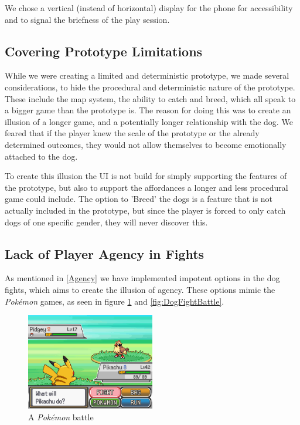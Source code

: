 
We chose a vertical (instead of horizontal) display for the phone for accessibility and to signal the briefness of the play session.

\subsection{Covering Prototype Limitations}
\label{limitations}
While we were creating a limited and deterministic prototype, we made several considerations, to hide the procedural and deterministic nature of the prototype. These include the map system, the ability to catch and breed, which all speak to a bigger game than the prototype is. The reason for doing this was to create an illusion of a longer game, and a potentially longer relationship with the dog. We feared that if the player knew the scale of the prototype or the already determined outcomes, they would not allow themselves to become emotionally attached to the dog. \

To create this illusion the UI is not build for simply supporting the features of the prototype, but also to support the affordances a longer and less procedural game could include. The option to 'Breed' the dogs is a feature that is not actually included in the prototype, but since the player is forced to only catch dogs of one specific gender, they will never discover this.\

\subsection{Lack of Player Agency in Fights}
As mentioned in \ref{Agency} we have implemented impotent options in the dog fights, which aims to create the illusion of agency. These options mimic the \textit{Pokémon} games, as seen in figure \ref{fig:PokeBattle} and \ref{fig:DogFightBattle}. \

\begin{figure}[h!] 
	\centering
    \includegraphics[width=0.5\textwidth]{PokemonBattle.png}
    \caption{A \textit{Pokémon} battle}
    \label{fig:PokeBattle}
\end{figure}

